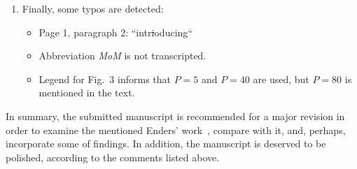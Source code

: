 \documentclass[11pt]{article}
\begin{document}
\begin{enumerate}
    \item Finally, some typos are detected:
    \begin{itemize}
        \item Page 1, paragraph 2: ``intr\sout{i}oducing``
        \item Abbreviation \emph{MoM} is not transcripted.
        \item Legend for Fig.~3 informs that $P=5$ and $P=40$ are used, but $P=80$ is mentioned in the text.
    \end{itemize}
\end{enumerate}



In summary, the submitted manuscript is recommended for a major revision
in order to examine the mentioned Enders' work~\cite{Ender1988},
compare with it, and, perhaps, incorporate some of findings.
In addition, the manuscript is deserved to be polished, according to the comments listed above.

\printbibliography
\end{document}
